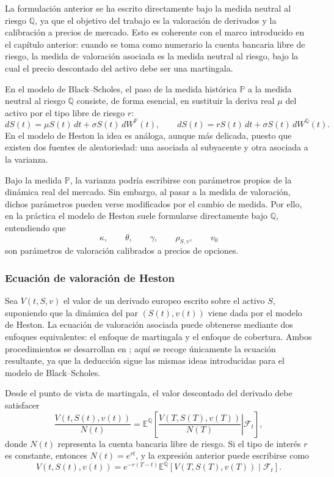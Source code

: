\begin{observation}
La formulación anterior se ha escrito directamente bajo la medida neutral al riesgo \(\mathbb{Q}\), ya que el objetivo del trabajo es la valoración de derivados y la calibración a precios de mercado. Esto es coherente con el marco introducido en el capítulo anterior: cuando se toma como numerario la cuenta bancaria libre de riesgo, la medida de valoración asociada es la medida neutral al riesgo, bajo la cual el precio descontado del activo debe ser una martingala.\medskip

En el modelo de Black--Scholes, el paso de la medida histórica \(\mathbb{P}\) a la medida neutral al riesgo \(\mathbb{Q}\) consiste, de forma esencial, en sustituir la deriva real \(\mu\) del activo por el tipo libre de riesgo \(r\):
\[
dS(t)=\mu S(t)\,dt+\sigma S(t)\,dW^{\mathbb{P}}(t),
\qquad
dS(t)=rS(t)\,dt+\sigma S(t)\,dW^{\mathbb{Q}}(t).
\]
En el modelo de Heston la idea es análoga, aunque más delicada, puesto que existen dos fuentes de aleatoriedad: una asociada al subyacente y otra asociada a la varianza.\medskip

Bajo la medida $\mathbb{P}$, la varianza podría escribirse con parámetros propios de la dinámica real del mercado. Sin embargo, al pasar a la medida de valoración, dichos parámetros pueden verse modificados por el cambio de medida. Por ello, en la práctica el modelo de Heston suele formularse directamente bajo \(\mathbb{Q}\), entendiendo que
\[
\kappa,\qquad \theta,\qquad \gamma,\qquad \rho_{S,v},\qquad v_0
\]
son parámetros de valoración calibrados a precios de opciones.
\end{observation}

\subsubsection{Ecuación de valoración de Heston}

Sea \(V(t,S,v)\) el valor de un derivado europeo escrito sobre el activo \(S\), suponiendo que la dinámica del par \((S(t),v(t))\) viene dada por el modelo de Heston. La ecuación de valoración asociada puede obtenerse mediante dos enfoques equivalentes: el enfoque de martingala y el enfoque de cobertura. Ambos procedimientos se desarrollan en \cite[pp.~245--247]{oosterlee2021modelos}; aquí se recoge únicamente la ecuación resultante, ya que la deducción sigue las mismas ideas introducidas para el modelo de Black--Scholes. \medskip

Desde el punto de vista de martingala, el valor descontado del derivado debe satisfacer
\begin{equation}
\label{eq:heston_expectation}
\frac{V(t,S(t),v(t))}{N(t)}
=
\mathbb{E}^{\mathbb{Q}}
\left[
\left.
\frac{V(T,S(T),v(T))}{N(T)}
\right|
\mathcal{F}_t
\right],
\end{equation}
donde \(N(t)\) representa la cuenta bancaria libre de riesgo. Si el tipo de interés \(r\) es constante, entonces \(N(t)=e^{rt}\), y la expresión anterior puede escribirse como
\[
V(t,S(t),v(t))
=
e^{-r(T-t)}
\mathbb{E}^{\mathbb{Q}}
\left[
V(T,S(T),v(T))
\mid
\mathcal{F}_t
\right].
\]

